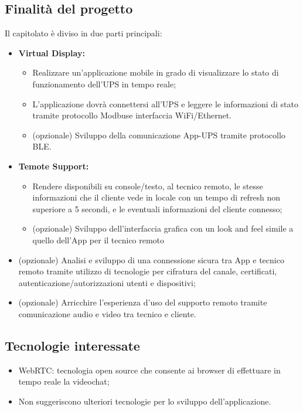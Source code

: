	\subsection{Finalità del progetto}
		Il capitolato è diviso in due parti principali:
		\begin {itemize}
			\item \textbf{Virtual Display:}
			\begin{itemize}
				\item Realizzare un’applicazione mobile in grado di visualizzare lo stato di funzionamento dell’UPS in tempo reale;
				\item L’applicazione dovrà connettersi all’UPS e leggere le informazioni di stato tramite protocollo Modbus\glo e interfaccia WiFi/Ethernet.
				\item (opzionale) Sviluppo della comunicazione App-UPS tramite protocollo BLE\glo.
			\end{itemize}
			\item \textbf{Temote Support:}
			\begin{itemize}
				\item Rendere disponibili su console/testo, al tecnico remoto, le stesse informazioni che il cliente vede in locale con un tempo di refresh non superiore a 5 secondi, e le eventuali informazioni del cliente connesso;
				\item (opzionale) Sviluppo dell’interfaccia grafica con un look and feel simile a quello dell’App per il tecnico remoto
			\end{itemize}
			\item (opzionale) Analisi e sviluppo di una connessione sicura tra App e tecnico remoto tramite utilizzo di	tecnologie per cifratura del canale, certificati, autenticazione/autorizzazioni utenti e dispositivi;
			\item (opzionale) Arricchire l’esperienza d’uso del supporto remoto tramite comunicazione audio e video tra	tecnico e cliente.
		\end {itemize}

	\subsection {Tecnologie interessate}
		\begin {itemize}
			\item WebRTC: tecnologia open source che consente ai browser di effettuare in tempo reale la videochat;
			\item Non suggeriscono ulteriori tecnologie per lo sviluppo dell'applicazione.
		\end {itemize}

